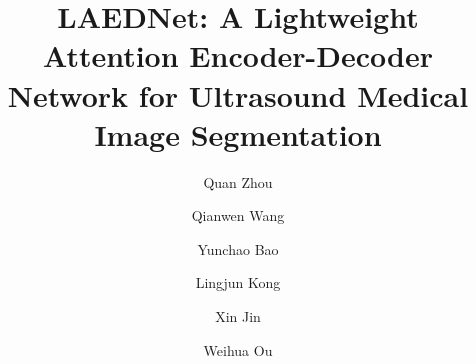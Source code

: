 \documentclass[review]{elsarticle}
\begin{document}
\begin{frontmatter}

\title{LAEDNet: A Lightweight Attention Encoder-Decoder Network for Ultrasound Medical Image Segmentation}



\author[mymainaddress]{Quan Zhou}

\author[mymainaddress]{Qianwen Wang}

\author[mymainaddress]{Yunchao Bao}

\author[mysecondaryaddress]{Lingjun Kong}

\author[mythirdlyaddress]{Xin Jin}

\author[myfourthaddress]{Weihua Ou}

\address[mymainaddress]{National Engineering Research Center of Communications and Networking, \\
Nanjing University of Posts and Telecommunications, Nanjing, China}
\address[mysecondaryaddress]{Faculty of Network and Telecommunication Engineering, Jinling Institute of Technology, Nanjing, China}
\address[mythirdlyaddress]{Department of Computer Science and Technology, 
Beijing Electronic Science and Technology Institute, Beijing, China}
\address[myfourthaddress]{School of Big Data and Computer Science, Guizhou Normal University, Guiyang, China}


\end{frontmatter}
\end{document}
